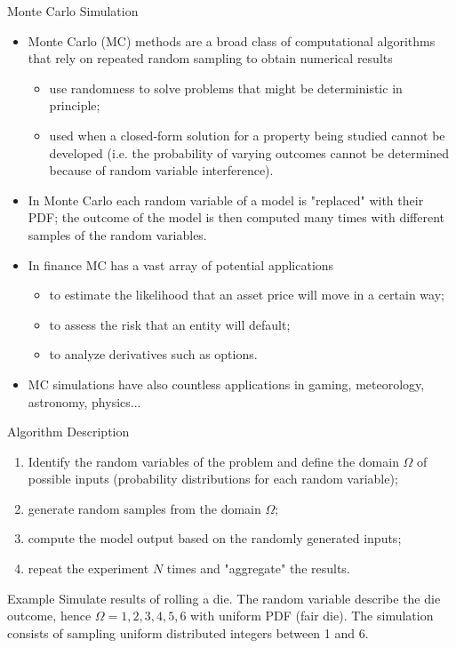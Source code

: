 \documentclass{beamer}
\begin{document}
\begin{frame}{Monte Carlo Simulation}
    \begin{itemize}
    \item Monte Carlo (MC) methods are a broad class of computational algorithms that rely on repeated random sampling to obtain numerical results
    \begin{itemize}
        \item use randomness to solve problems that might be deterministic in principle;
        \item used when a closed-form solution for a property being studied cannot be developed (i.e. the probability of varying outcomes cannot be determined because of random variable interference). 
     \end{itemize}
    \item In Monte Carlo each random variable of a model is "replaced" with their PDF; the outcome of the model is then computed many times with different samples of the random variables. 
    \item In finance MC has a vast array of potential applications
    \begin{itemize}
        \item to estimate the likelihood that an asset price will move in a certain way;
        \item to assess the risk that an entity will default;
        \item to analyze derivatives such as options.
     \end{itemize}
    \item MC simulations have also countless applications in gaming, meteorology, astronomy, physics...
    \end{itemize}
\end{frame}

\begin{frame}{Algorithm Description}
    \begin{enumerate}
    \item Identify the random variables of the problem and define the domain $\Omega$ of possible inputs (probability distributions for each random variable);
    \item generate random samples from the domain $\Omega$;
    \item compute the model output based on the randomly generated inputs;
    \item repeat the experiment $N$ times and "aggregate" the results.
    \end{enumerate}
    \begin{block}{Example}
    Simulate results of rolling a die. The random variable describe the die outcome, hence $\Omega = {1,2,3,4,5,6}$ with uniform PDF (fair die).
    The simulation consists of sampling uniform distributed integers between 1 and 6.
    \end{block}
\end{frame}
\end{document}
